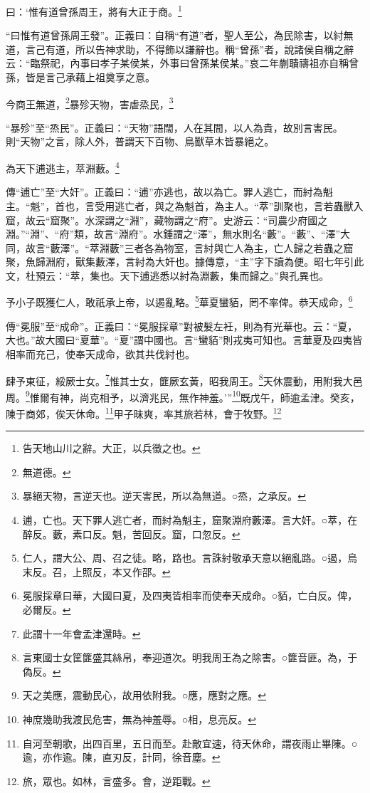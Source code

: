 曰：‘惟有道曾孫周王，將有大正于商。\footnote{告天地山川之辭。大正，以兵徵之也。}

{\noindent\shu{}\fzkt “曰惟有道曾孫周王發”。正義曰：自稱“有道”者，聖人至公，為民除害，以紂無道，言己有道，所以告神求助，不得飾以謙辭也。稱“曾孫”者，說諸侯自稱之辭云：“臨祭祀，內事曰孝子某侯某，外事曰曾孫某侯某。”哀二年蒯聵禱祖亦自稱曾孫，皆是言己承藉上祖奠享之意。 \par}

今商王無道，\footnote{無道德。}暴殄天物，害虐烝民，\footnote{暴絕天物，言逆天也。逆天害民，所以為無道。○烝，之承反。}

{\noindent\shu{}\fzkt “暴殄”至“烝民”。正義曰：“天物”語闊，人在其間，以人為貴，故別言害民。則“天物”之言，除人外，普謂天下百物、鳥獸草木皆暴絕之。 \par}

為天下逋逃主，萃淵藪。\footnote{逋，亡也。天下罪人逃亡者，而紂為魁主，窟聚淵府藪澤。言大奸。○萃，在醉反。藪，素口反。魁，苦回反。窟，口忽反。}

{\noindent\zhuan{}\fzbyks 傳“逋亡”至“大奸”。正義曰：“逋”亦逃也，故以為亡。罪人逃亡，而紂為魁主。“魁”，首也，言受用逃亡者，與之為魁首，為主人。“萃”訓聚也，言若蟲獸入窟，故云“窟聚”。水深謂之“淵”，藏物謂之“府”。史游云：“司農少府國之淵。”“淵”、“府”類，故言“淵府”。水鍾謂之“澤”，無水則名“藪”。“藪”、“澤”大同，故言“藪澤”。“萃淵藪”三者各為物室，言紂與亡人為主，亡人歸之若蟲之窟聚，魚歸淵府，獸集藪澤，言紂為大奸也。據傳意，“主”字下讀為便。昭七年引此文，杜預云：“萃，集也。天下逋逃悉以紂為淵藪，集而歸之。”與孔異也。 \par}

予小子既獲仁人，敢祇承上帝，以遏亂略。\footnote{仁人，謂大公、周、召之徒。略，路也。言誅紂敬承天意以絕亂路。○遏，烏末反。召，上照反，本又作邵。}華夏蠻貊，罔不率俾。恭天成命，\footnote{冕服採章曰華，大國曰夏，及四夷皆相率而使奉天成命。○貊，亡白反。俾，必爾反。}

{\noindent\zhuan{}\fzbyks 傳“冕服”至“成命”。正義曰：“冕服採章”對被髮左衽，則為有光華也。云：“夏，大也。”故大國曰“夏華”。“夏”謂中國也。言“蠻貊”則戎夷可知也。言華夏及四夷皆相率而充己，使奉天成命，欲其共伐紂也。 \par}

肆予東征，綏厥士女。\footnote{此謂十一年會孟津還時。}惟其士女，篚厥玄黃，昭我周王。\footnote{言東國士女筐篚盛其絲帛，奉迎道次。明我周王為之除害。○篚音匪。為，于偽反。}天休震動，用附我大邑周。\footnote{天之美應，震動民心，故用依附我。○應，應對之應。}惟爾有神，尚克相予，以濟兆民，無作神羞。’”\footnote{神庶幾助我渡民危害，無為神羞辱。○相，息亮反。}既戊午，師逾孟津。癸亥，陳于商郊，俟天休命。\footnote{自河至朝歌，出四百里，五日而至。赴敵宜速，待天休命，謂夜雨止畢陳。○逾，亦作逾。陳，直刃反，計同，徐音塵。}甲子昧爽，率其旅若林，會于牧野。\footnote{旅，眾也。如林，言盛多。會，逆距戰。}



